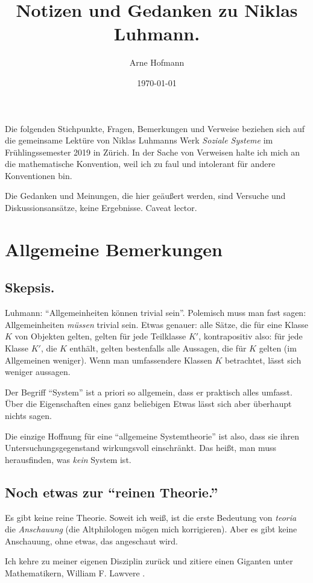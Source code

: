 \documentclass[a4paper, 10pt]{amsart}
\begin{document}
\setcounter{tocdepth}{1}
\title{Notizen und Gedanken zu Niklas Luhmann.}
\author{Arne Hofmann}
\date{\today}
\maketitle
\tableofcontents
Die folgenden Stichpunkte, Fragen, Bemerkungen und Verweise beziehen sich auf die gemeinsame Lektüre von Niklas Luhmanns Werk \emph{Soziale Systeme} \cite{luhmann1984soziale} im Früh\-lings\-se\-mes\-ter 2019 in Zürich. In der Sache von Verweisen halte ich mich an die mathematische Konvention, weil ich zu faul und intolerant für andere Konventionen bin.

Die Gedanken und Meinungen, die hier geäußert werden, sind Versuche und Diskussionsansätze, keine Ergebnisse. Caveat lector.
\section{Allgemeine Bemerkungen}
\subsection{Skepsis.}
Luhmann: ``Allgemeinheiten können trivial sein''. Polemisch muss man fast sagen: Allgemeinheiten \emph{m\"ussen} trivial sein. Etwas genauer: alle Sätze, die für eine Klasse $K$ von Objekten gelten, gelten für jede Teilklasse $K'$, kontrapositiv also: für jede Klasse $K'$, die $K$ enthält, gelten bestenfalls alle Aussagen, die für $K$ gelten (im Allgemeinen weniger). Wenn man umfassendere Klassen $K$ betrachtet, lässt sich weniger aussagen.

Der Begriff ``System'' ist a priori so allgemein, dass er praktisch alles umfasst. Über die Eigenschaften eines ganz beliebigen Etwas lässt sich aber überhaupt nichts sagen.

Die einzige Hoffnung für eine ``allgemeine Systemtheorie'' ist also, dass sie ihren Untersuchungsgegenstand wirkungsvoll einschränkt. Das heißt, man muss herausfinden, was \emph{kein} System ist.
\subsection{Noch etwas zur ``reinen Theorie.''}
\label{sec:reine-theorie}
Es gibt keine reine Theorie. Soweit ich weiß, ist die erste Bedeutung von \emph{teoria} die \emph{Anschauung} (die Altphilologen mögen mich korrigieren). Aber es gibt keine Anschauung, ohne etwas, das angeschaut wird.

Ich kehre zu meiner eigenen Disziplin zurück und zitiere einen Giganten unter Mathematikern, William F. Lawvere \cite{InterviewWilliamLawvere}.
\end{document}
